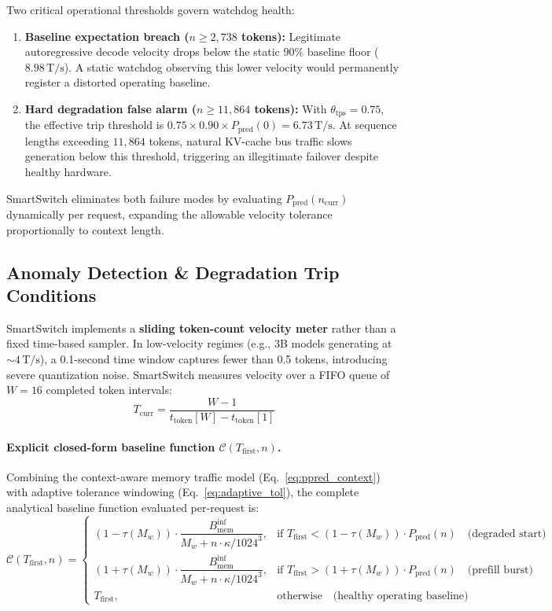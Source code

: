\documentclass[11pt,a4paper]{article}
\newcommand{\Binf}{B_{\mathrm{mem}}^{\mathrm{inf}}}
\newcommand{\Tfirst}{T_{\mathrm{first}}}
\newcommand{\Tcurr}{T_{\mathrm{curr}}}
\newcommand{\Ppred}{P_{\mathrm{pred}}}
\newcommand{\Mw}{M_w}
\newcommand{\Cfun}{\mathcal{C}}
\newcommand{\Ts}{\,\mathrm{T/s}}
\begin{document}
\begin{tcolorbox}[warnbox,title={Context-Aware Trip Analysis}]
Two critical operational thresholds govern watchdog health:
\begin{enumerate}[leftmargin=*]
\item \textbf{Baseline expectation breach ($n \ge 2{,}738$ tokens):} Legitimate autoregressive decode velocity drops below the static $90\%$ baseline floor ($8.98\Ts$). A static watchdog observing this lower velocity would permanently register a distorted operating baseline.
\item \textbf{Hard degradation false alarm ($n \ge 11{,}864$ tokens):} With $\theta_{\mathrm{tps}} = 0.75$, the effective trip threshold is $0.75 \times 0.90 \times \Ppred(0) = 6.73\Ts$. At sequence lengths exceeding $11{,}864$ tokens, natural KV-cache bus traffic slows generation below this threshold, triggering an illegitimate failover despite healthy hardware.
\end{enumerate}
SmartSwitch eliminates both failure modes by evaluating $\Ppred(n_{\mathrm{curr}})$ dynamically per request, expanding the allowable velocity tolerance proportionally to context length.
\end{tcolorbox}

\subsection{Anomaly Detection \& Degradation Trip Conditions}
SmartSwitch implements a \textbf{sliding token-count velocity meter} rather than a fixed time-based sampler. In low-velocity regimes (e.g., 3B models generating at $\sim 4\Ts$), a 0.1-second time window captures fewer than 0.5 tokens, introducing severe quantization noise. SmartSwitch measures velocity over a FIFO queue of $W = 16$ completed token intervals:
\begin{equation}\label{eq:tcurr}
\Tcurr = \frac{W-1}{t_{\mathrm{token}}[W] - t_{\mathrm{token}}[1]}
\end{equation}

\paragraph{Explicit closed-form baseline function $\Cfun(\Tfirst, n)$.}
Combining the context-aware memory traffic model (Eq.~\ref{eq:ppred_context}) with adaptive tolerance windowing (Eq.~\ref{eq:adaptive_tol}), the complete analytical baseline function evaluated per-request is:
\begin{equation}\label{eq:c_full}
\Cfun(\Tfirst, n) = \begin{cases}
(1 - \tau(\Mw)) \cdot \dfrac{\Binf}{\Mw + n \cdot \kappa / 1024^3}, & \text{if } \Tfirst < (1 - \tau(\Mw)) \cdot \Ppred(n) \quad\text{(degraded start)}\\[8pt]
(1 + \tau(\Mw)) \cdot \dfrac{\Binf}{\Mw + n \cdot \kappa / 1024^3}, & \text{if } \Tfirst > (1 + \tau(\Mw)) \cdot \Ppred(n) \quad\text{(prefill burst)}\\[8pt]
\Tfirst, & \text{otherwise} \quad\text{(healthy operating baseline)}
\end{cases}
\end{equation}
\end{document}
